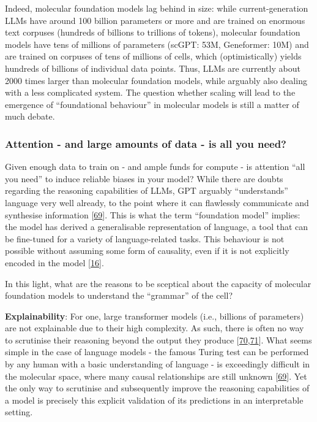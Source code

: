 Indeed, molecular foundation models lag behind in size: while current-generation LLMs have around 100 billion parameters or more and are trained on enormous text corpuses (hundreds of billions to trillions of tokens), molecular foundation models have tens of millions of parameters (scGPT: 53M, Geneformer: 10M) and are trained on corpuses of tens of millions of cells, which (optimistically) yields hundreds of billions of individual data points.
Thus, LLMs are currently about 2000 times larger than molecular foundation models, while arguably also dealing with a less complicated system.
The question whether scaling will lead to the emergence of ``foundational behaviour'' in molecular models is still a matter of much debate.

\hypertarget{attention---and-large-amounts-of-data---is-all-you-need}{%
\subsubsection{Attention - and large amounts of data - is all you need?}\label{attention---and-large-amounts-of-data---is-all-you-need}}

Given enough data to train on - and ample funds for compute - is attention ``all you need'' to induce reliable biases in your model?
While there are doubts regarding the reasoning capabilities of LLMs, GPT arguably ``understands'' language very well already, to the point where it can flawlessly communicate and synthesise information {[}\protect\hyperlink{ref-19EQh1DNG}{69}{]}.
This is what the term ``foundation model'' implies: the model has derived a generalisable representation of language, a tool that can be fine-tuned for a variety of language-related tasks.
This behaviour is not possible without assuming some form of causality, even if it is not explicitly encoded in the model {[}\protect\hyperlink{ref-10mjWN2op}{16}{]}.

In this light, what are the reasons to be sceptical about the capacity of molecular foundation models to understand the ``grammar'' of the cell?

\textbf{Explainability}: For one, large transformer models (i.e., billions of parameters) are not explainable due to their high complexity.
As such, there is often no way to scrutinise their reasoning beyond the output they produce {[}\protect\hyperlink{ref-1GbAsSOZV}{70},\protect\hyperlink{ref-15hYXC3QB}{71}{]}.
What seems simple in the case of language models - the famous Turing test can be performed by any human with a basic understanding of language - is exceedingly difficult in the molecular space, where many causal relationships are still unknown {[}\protect\hyperlink{ref-19EQh1DNG}{69}{]}.
Yet the only way to scrutinise and subsequently improve the reasoning capabilities of a model is precisely this explicit validation of its predictions in an interpretable setting.

